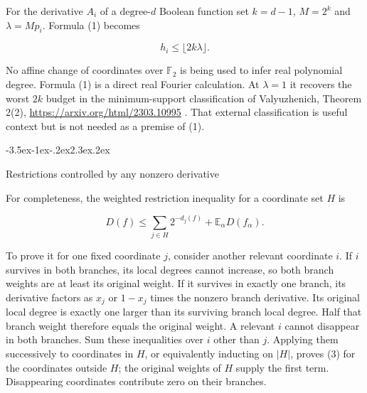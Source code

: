 \documentclass[11pt]{article}
\makeatletter
\renewcommand\section{\@startsection{section}{1}{\z@}
  {-3.5ex\@plus -1ex\@minus -.2ex}{2.3ex\@plus .2ex}
  {\normalfont\Large\bfseries\raggedright}}
\theoremstyle{remark}
\theoremstyle{correctionstyle}
\makeatother
\begin{document}
\leavevmode\label{src-p026}For the derivative $A_i$ of a $\text{degree-}d$ Boolean function set $k=d-1$,
$M=2^k$ and $\lambda=Mp_i$. Formula (1) becomes\label{src-end-p026}\par

\begin{equation}
h_i\le\lfloor2k\lambda\rfloor.\tag{2}
\label{src-p027}
\end{equation}

\leavevmode\label{src-p028}No affine change of coordinates over $\mathbb F_2$ is being used to infer real
polynomial degree. Formula (1) is a direct real Fourier calculation. At
$\lambda=1$ it recovers the worst $2k$ budget in the minimum-support
classification of Valyuzhenich, Theorem 2(2),
\url{https://arxiv.org/html/2303.10995} . That external classification is useful
context but is not needed as a premise of (1).\label{src-end-p028}\par

\section{Restrictions controlled by any nonzero derivative}\label{src-p029}\label{src-end-p029}

\leavevmode\label{src-p030}For completeness, the weighted restriction inequality for a coordinate
set $H$ is\label{src-end-p030}\par

\begin{equation}
D(f)\le\sum_{j\in H}2^{-d_j(f)}+\mathbb E_\alpha D(f_\alpha).\tag{3}
\label{src-p031}
\end{equation}

\leavevmode\label{src-p032}To prove it for one fixed coordinate $j$, consider another relevant
coordinate $i$. If $i$ survives in both branches, its local degrees cannot
increase, so both branch weights are at least its original weight. If it
survives in exactly one branch, its derivative factors as $x_j$ or $1-x_j$ times
the nonzero branch derivative. Its original local degree is exactly one
larger than its surviving branch local degree. Half that branch weight
therefore equals the original weight. A relevant $i$ cannot disappear in
both branches. Sum these inequalities over $i$ other than $j$. Applying them
successively to coordinates in $H$, or equivalently inducting on $|H|$, proves
(3) for the coordinates outside $H$; the original weights of $H$ supply the
first term. Disappearing coordinates contribute zero on their branches.\label{src-end-p032}\par
\end{document}

